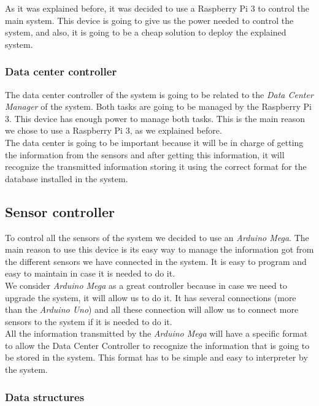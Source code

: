 As it was explained before, it was decided to use a Raspberry Pi 3 to control the main system. This device is going to give us the power needed to control the system, and also, it is going to be a cheap solution to deploy the explained system.

\subsubsection{Data center controller}

The data center controller of the system is going to be related to the \textit{Data Center Manager} of the system. Both tasks are going to be managed by the Raspberry Pi 3. This device has enough power to manage both tasks. This is the main reason we chose to use a Raspberry Pi 3, as we explained before.\\

The data center is going to be important because it will be in charge of getting the information from the sensors and after getting this information, it will recognize the transmitted information storing it using the correct format for the database installed in the system.

\subsection{Sensor controller}

To control all the sensors of the system we decided to use an \textit{Arduino Mega}. The main reason to use this device is its easy way to manage the information got from the different sensors we have connected in the system. It is easy to program and easy to maintain in case it is needed to do it.\\

We consider \textit{Arduino Mega} as a great controller because in case we need to upgrade the system, it will allow us to do it. It has several connections (more than the \textit{Arduino Uno}) and all these connection will allow us to connect more sensors to the system if it is needed to do it.\\

All the information transmitted by the \textit{Arduino Mega} will have a specific format to allow the Data Center Controller to recognize the information that is going to be stored in the system. This format has to be simple and easy to interpreter by the system.

\subsubsection{Data structures}

